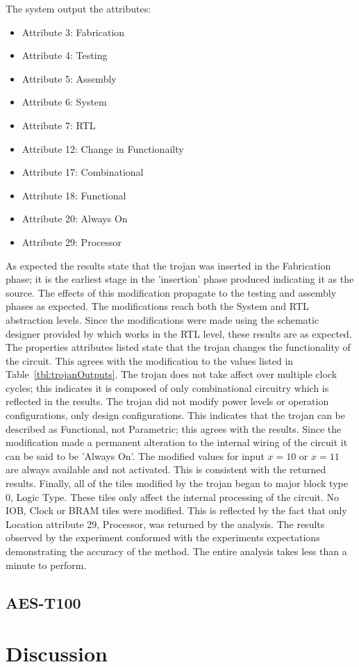 The system output the attributes:
\begin{itemize}
	\item Attribute 3: Fabrication
	\item Attribute 4: Testing
	\item Attribute 5: Assembly
	\item Attribute 6: System
	\item Attribute 7: RTL
	\item Attribute 12: Change in Functionailty
	\item Attribute 17: Combinational
	\item Attribute 18: Functional
	\item Attribute 20: Always On
	\item Attribute 29: Processor
\end{itemize}
As expected the results state that the trojan was inserted in the Fabrication phase; it is the earliest stage in the 'insertion' phase produced indicating it as the source.
The effects of this modification propagate to the testing and assembly phases as expected.
The modifications reach both the System and \acrfull{RTL} abstraction levels.
Since the modifications were made using the schematic designer provided by \Xilinx which works in the \acrshort{RTL} level, these results are as expected.
The properties attributes listed state that the trojan changes the functionality of the circuit. 
This agrees with the modification to the values listed in Table~\ref{tbl:trojanOutputs}.
The trojan does not take affect over multiple clock cycles; this indicates it is composed of only combinational circuitry which is reflected in the results.
The trojan did not modify power levels or operation configurations, only design configurations.
This indicates that the trojan can be described as Functional, not Parametric; this agrees with the results.
Since the modification made a permanent alteration to the internal wiring of the circuit it can be said to be 'Always On'.
The modified values for input $x=10$ or $x=11$ are always available and not activated.
This is consistent with the returned results.
Finally, all of the tiles modified by the trojan began to major block type 0, Logic Type.
These tiles only affect the internal processing of the circuit.
No \acrshort{IOB}, Clock or \acrshort{BRAM} tiles were modified.
This is reflected by the fact that only Location attribute 29, Processor, was returned by the analysis.
The results observed by the experiment conformed with the experiments expectations demonstrating the accuracy of the method.
The entire analysis takes less than a minute to perform.
\subsection{AES-T100}
\section{Discussion}